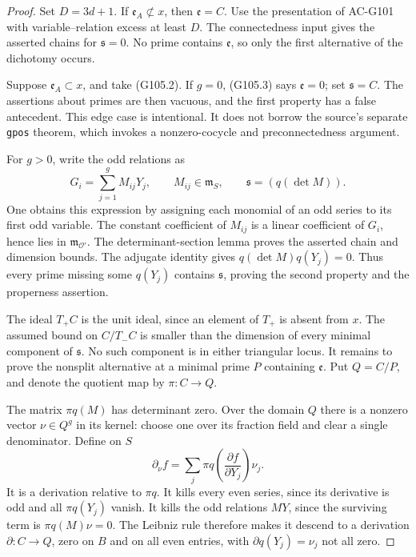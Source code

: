 \begin{proof}
Set \(D=3d+1\).  If \(\mathfrak e_A\not\subset x\),
then \(\mathfrak e=C\).  Use the presentation of
AC-G101 with variable--relation excess at least \(D\).
The connectedness input gives the asserted chains for
\(\mathfrak s=0\).  No prime contains \(\mathfrak e\),
so only the first alternative of the dichotomy occurs.

Suppose \(\mathfrak e_A\subset x\), and take (G105.2).
If \(g=0\), (G105.3) says \(\mathfrak e=0\); set
\(\mathfrak s=C\).  The assertions about primes are
then vacuous, and the first property has a false
antecedent.  This edge case is intentional.  It does
not borrow the source's separate \texttt{gpos}
theorem, which invokes a nonzero-cocycle and
preconnectedness argument.

For \(g>0\), write the odd relations as
\[
             G_i=\sum_{j=1}^g M_{ij}Y_j,
             \qquad M_{ij}\in\mathfrak m_S,
             \qquad \mathfrak s=(q(\det M)).
 \tag{G105.14}
\]
One obtains this expression by assigning each monomial
of an odd series to its first odd variable.  The
constant coefficient of \(M_{ij}\) is a linear
coefficient of \(G_i\), hence lies in
\(\mathfrak m_{\mathcal O'}\).  The determinant-section
lemma proves the asserted chain and dimension bounds.
The adjugate identity gives
\(q(\det M)q(Y_j)=0\).  Thus every prime missing some
\(q(Y_j)\) contains \(\mathfrak s\), proving the second
property and the properness assertion.

The ideal \(T_+C\) is the unit ideal, since an element
of \(T_+\) is absent from \(x\).  The assumed bound
on \(C/T_-C\) is smaller than the dimension of every
minimal component of \(\mathfrak s\).  No such
component is in either triangular locus.
It remains to prove the nonsplit alternative at a
minimal prime \(P\) containing \(\mathfrak e\).
Put \(Q=C/P\), and denote the quotient map by
\(\pi:C\to Q\).

The matrix \(\pi q(M)\) has determinant zero.  Over
the domain \(Q\) there is a nonzero vector
\(\nu\in Q^g\) in its kernel: choose one over its
fraction field and clear a single denominator.
Define on \(S\)
\[
       \partial_\nu f
          =\sum_j \pi q\left(\frac{\partial f}{\partial Y_j}\right)
                    \nu_j.
 \tag{G105.15}
\]
It is a derivation relative to \(\pi q\).  It kills
every even series, since its derivative is odd and
all \(\pi q(Y_j)\) vanish.  It kills the odd
relations \(MY\), since the surviving term is
\(\pi q(M)\nu=0\).  The Leibniz rule therefore
makes it descend to a derivation
\(\partial:C\to Q\), zero on \(B\) and on all
even entries, with
\(\partial q(Y_j)=\nu_j\) not all zero.


\end{proof}
